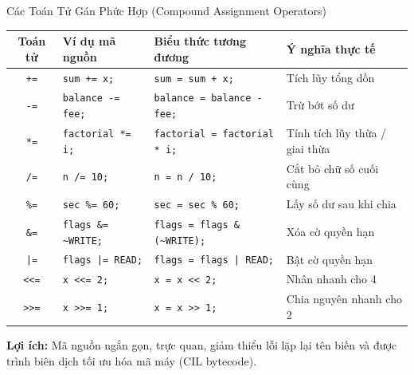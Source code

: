 \documentclass[aspectratio=169, 10pt]{beamer}
\begin{document}
\begin{frame}[fragile]{Các Toán Tử Gán Phức Hợp (Compound Assignment Operators)}
  \begin{table}[h]
    \centering
    \small
    \begin{tabularx}{\textwidth}{c l l p{4cm}}
      \toprule
      \textbf{Toán tử} & \textbf{Ví dụ mã nguồn} & \textbf{Biểu thức tương đương} & \textbf{Ý nghĩa thực tế} \\
      \midrule
      \texttt{+=} & \texttt{sum += x;} & \texttt{sum = sum + x;} & Tích lũy tổng dồn \\
      \texttt{-=} & \texttt{balance -= fee;} & \texttt{balance = balance - fee;} & Trừ bớt số dư \\
      \texttt{*=} & \texttt{factorial *= i;} & \texttt{factorial = factorial * i;} & Tính tích lũy thừa / giai thừa \\
      \texttt{/=} & \texttt{n /= 10;} & \texttt{n = n / 10;} & Cắt bỏ chữ số cuối cùng \\
      \texttt{\%=} & \texttt{sec \%= 60;} & \texttt{sec = sec \% 60;} & Lấy số dư sau khi chia \\
      \texttt{\&=} & \texttt{flags \&= \textasciitilde WRITE;} & \texttt{flags = flags \& (\textasciitilde WRITE);} & Xóa cờ quyền hạn \\
      \texttt{|=} & \texttt{flags |= READ;} & \texttt{flags = flags | READ;} & Bật cờ quyền hạn \\
      \texttt{<<=} & \texttt{x <<= 2;} & \texttt{x = x << 2;} & Nhân nhanh cho 4 \\
      \texttt{>>=} & \texttt{x >>= 1;} & \texttt{x = x >> 1;} & Chia nguyên nhanh cho 2 \\
      \bottomrule
    \end{tabularx}
  \end{table}

  \begin{exampleblock}{\textbf{Lợi ích:}}
    Mã nguồn ngắn gọn, trực quan, giảm thiểu lỗi lặp lại tên biến và được trình biên dịch tối ưu hóa mã máy (CIL bytecode).
  \end{exampleblock}
\end{frame}
\end{document}
